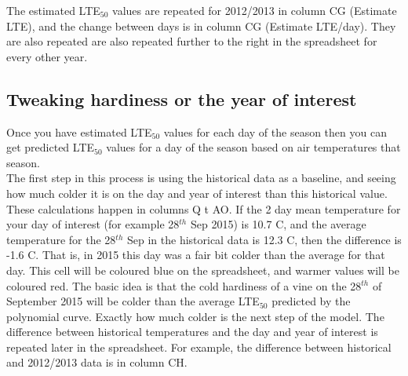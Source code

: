 \documentclass[11pt,letter]{article}
\begin{document}
The estimated LTE$_{50}$ values are repeated  for 2012/2013 in column CG (Estimate LTE), and the change between days is in column CG (Estimate LTE/day). They are also repeated are also repeated further to the right in the spreadsheet for every other year. 

\subsection{Tweaking hardiness or the year of interest}

Once you have estimated LTE$_{50}$ values for each day of the season then you can get predicted LTE$_{50}$ values for a day of the season based on air temperatures that season. \\

The first step in this process is using the historical data as a baseline, and seeing how much colder it is on the day and year of interest than this historical value. These calculations happen in columns Q t AO. If the 2 day mean temperature for your day of interest (for example 28$^{th}$ Sep 2015) is 10.7 \textdegree{}C, and the average temperature for the 28$^{th}$ Sep in the historical data is 12.3 \textdegree{}C, then the difference is -1.6 \textdegree{}C. That is, in 2015 this day was a fair bit colder than the average for that day. This cell will be coloured blue on the spreadsheet, and warmer values will be coloured red. The basic idea is that the cold hardiness of a vine on the 28$^{th}$ of September 2015 will be colder than the average LTE$_{50}$ predicted by the polynomial curve. Exactly how much colder is the next step of the model. The difference between historical temperatures and the day and year of interest is repeated later in the spreadsheet. For example, the difference between historical and 2012/2013 data is in column CH. \\
\end{document}
